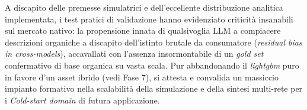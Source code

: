 A discapito delle premesse simulatrici e dell'eccellente distribuzione analitica implementata, i test pratici di validazione hanno evidenziato criticità insanabili sul mercato nativo: la propensione innata di qualsivoglia LLM a compiacere descrizioni organiche a discapito dell'istinto brutale da consumatore (\textit{residual bias in cross-models}), accavallati con l'assenza insormontabile di un \textit{gold set} confermativo di base organica su vasta scala. Pur abbandonando il \textit{lightgbm} puro in favore d'un asset ibrido (vedi Fase 7), si attesta e convalida un massiccio impianto formativo nella scalabilità della simulazione e della sintesi multi-rete per i \textit{Cold-start domain} di futura applicazione.
